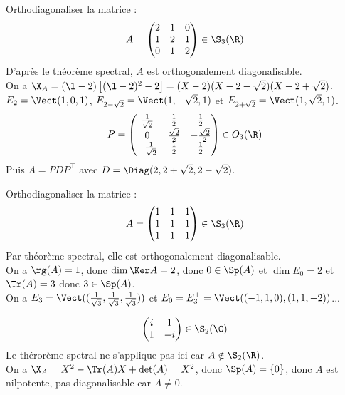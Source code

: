 \documentclass[11pt]{article}
\begin{document}
\begin{ex}{}{}
    Orthodiagonaliser la matrice :
    \begin{equation*}
        A=\begin{pmatrix}
          2 & 1 & 0 \\ 1 & 2 & 1 \\ 0 & 1 & 2   
        \end{pmatrix} \in \S_3(\R)
    \end{equation*}
    \tcblower
    D'après le théorème spectral, $A$ est orthogonalement diagonalisable.\\
    On a $\X_A = (\l-2)\left[ (\l - 2)^2 - 2 \right] = (X - 2)(X - 2 - \sqrt{2})(X - 2 + \sqrt{2})$.\\
    $E_2=\Vect(1,0,1)$, $E_{2-\sqrt{2}}=\Vect(1,-\sqrt{2},1)$ et $E_{2+\sqrt{2}}=\Vect(1,\sqrt{2},1)$.
    \begin{equation*}
        P = \begin{pmatrix}\frac{1}{\sqrt{2}} & \frac{1}{2} & \frac{1}{2} \\ 0 & \frac{\sqrt{2}}{2} & -\frac{\sqrt{2}}{2} \\ -\frac{1}{\sqrt{2}} & \frac{1}{2} & \frac{1}{2}\end{pmatrix}\in O_3(\R)
    \end{equation*}
    Puis $A=PDP^\top$ avec $D=\Diag(2,2+\sqrt{2},2-\sqrt{2})$.
\end{ex}

\begin{ex}{}{}
    Orthodiagonaliser la matrice :
    \begin{equation*}
        A = \begin{pmatrix}1&1&1\\1&1&1\\1&1&1\end{pmatrix} \in \S_3(\R)
    \end{equation*}
    \tcblower
    Par théorème spectral, elle est orthogonalement diagonalisable.\\
    On a $\rg(A)=1$, donc $\dim\Ker A = 2$, donc $0\in\Sp(A)$ et $\dim E_0 = 2$ et $\Tr(A)=3$ donc $3\in\Sp(A)$.\\
    On a $E_3=\Vect((\frac{1}{\sqrt{3}}, \frac{1}{\sqrt{3}}, \frac{1}{\sqrt{3}}))$ et $E_0=E_3^\bot=\Vect((-1,1,0),(1,1,-2))$...
\end{ex}

\begin{ex}{}{}
    \begin{equation*}
        \begin{pmatrix}
            i&1\\1&-i 
        \end{pmatrix} \in \S_2(\C)
    \end{equation*}
    \tcblower
    Le thérorème spetral ne s'applique pas ici car $A\notin\S_2(\R)$.\\
    On a $\X_A=X^2-\Tr(A)X+\det(A)=X^2$, donc $\Sp(A)=\{0\}$, donc $A$ est nilpotente, pas diagonalisable car $A\neq0$.
\end{ex}
\end{document}
